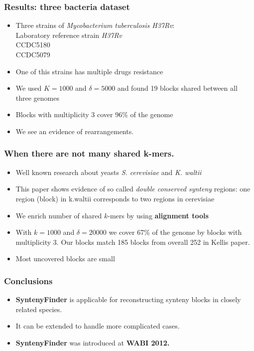\documentclass[svgnames,14pt]{beamer}
\begin{document}
\begin{frame}
\frametitle{Results: three bacteria dataset}
\begin{itemize}
\item Three strains of \textit{Mycobacterium tuberculosis H37Rv}: \\
Laboratory reference strain \textit{H37Rv} \\
CCDC5180 \\
CCDC5079 \\
\item One of this strains has multiple drugs resistance
\item We used \(K = 1000\) and \(\delta = 5000\) and found 19 blocks shared between all three genomes
\item Blocks with multiplicity 3 cover 96\% of the genome
\item We see an evidence of rearrangements.
\end{itemize}
\end{frame}

\begin{frame}
\frametitle{When there are not many shared k-mers.}
\begin{itemize}
\item Well known research about yeasts \textit{S. cerevisiae} and \textit{K. waltii}  
\item This paper shows evidence of so called \textit{double conserved synteny} regions: one region (block) in k.waltii corresponds to two
regions in cerevisiae
\item We enrich number of shared \(k\)-mers by using \textbf{alignment tools}
\item With \(k = 1000\) and \(\delta = 20 000 \) we cover 67\% of the genome by blocks with multiplicity 3. Our blocks match 185 blocks
from overall 252 in Kellis paper.
\item Most uncovered blocks are small
\end{itemize}
\end{frame}


\begin{frame}
\frametitle{Conclusions}
\begin{itemize}
    \item \textbf{SyntenyFinder} is applicable for reconstructing synteny blocks in closely related species.
\item It can be extended to handle more complicated cases. 
\item \textbf{SyntenyFinder} was introduced at \textbf{WABI 2012.}
\end{itemize}
\end{frame}
\end{document}
